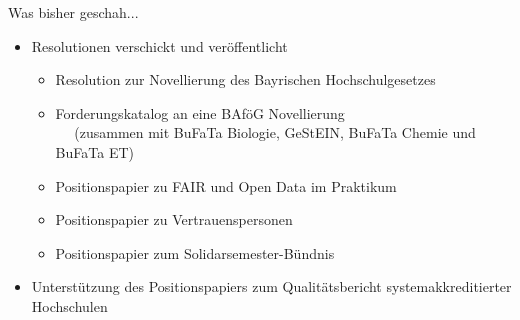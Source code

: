 \documentclass[compress, aspectratio=169]{beamer}
\begin{document}





\begin{frame}{Was bisher geschah...}
 \begin{itemize}
  \item Resolutionen verschickt und veröffentlicht
  \begin{itemize}
    \item Resolution zur Novellierung des Bayrischen Hochschulgesetzes
    \item Forderungskatalog an eine BAföG Novellierung \\
    $\quad$ (zusammen mit BuFaTa Biologie, GeStEIN, BuFaTa Chemie und BuFaTa ET)
    \item Positionspapier zu FAIR und Open Data im Praktikum
    \item Positionspapier zu Vertrauenspersonen
    \item Positionspapier zum Solidarsemester-Bündnis
   \end{itemize}
   \item Unterstützung des Positionspapiers zum Qualitätsbericht systemakkreditierter Hochschulen 
 \end{itemize}
\end{frame}
%
\end{document}
